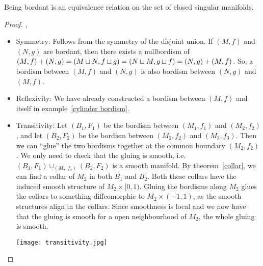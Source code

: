 \documentclass[a4paper,11pt]{article}
\begin{document}
\begin{proposition}\cite[II, Satz 1.4]{brocker}\label{equivalence bordant}
    Being bordant is an equivalence relation on the set of closed singular manifolds.
\end{proposition}

\begin{proof}\cite{brocker},\ \cite[p.8]{conner}
    \begin{itemize}
        \item Symmetry: 
        Follows from the symmetry of the disjoint union. 
        If \((M,f)\) and \((N,g)\) are bordant, then there exists a nullbordism of \((M,f)+(N,g)=(M\sqcup N, f\sqcup g) = (N\sqcup M, g\sqcup f) = (N,g)+ (M,f)\). 
        So, a bordism between \((M,f)\) and \((N,g)\) is also bordism between \((N,g)\) and \((M,f)\).

        \item Reflexivity: 
        We have already constructed a bordism between \((M,f)\) and itself in example\ \ref{cylinder bordism}.

        \item Transitivity: 
        Let \((B_1,F_1)\) be the bordism between \((M_1,f_1)\) and \((M_2,f_2)\), and let \((B_2,F_2)\) be the bordism between \((M_2,f_2)\) and \((M_3,f_3)\). Then we can \enquote{glue} the two bordisms together at the common boundary \((M_2,f_2)\). 
        We only need to check that the gluing is smooth, i.e.\ \((B_1,F_1)\cup_{(M_2,f_2)}(B_2,F_2)\) is a smooth manifold. 
        By theorem\ \ref{collar}, we can find a collar of \(M_2\) in both \(B_1\) and \(B_2\). 
        Both these collars have the induced smooth structure of \(M_2\times [0,1)\). 
        Gluing the bordisms along \(M_2\) glues the collars to something diffeomorphic to \(M_2\times (-1,1)\), as the smooth structures align in the collars. 
        Since smoothness is local and we now have that the gluing is smooth for a open neighbourhood of \(M_2\), the whole gluing is smooth.
        \begin{center}
            \texttt{[image: transitivity.jpg]}
        \end{center}
    \end{itemize}
\end{proof}
\end{document}
